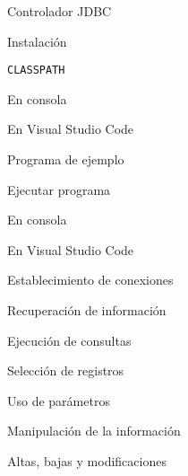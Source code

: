 \begin{longenum}
    \begin{longenum}
        \item Controlador JDBC
        \begin{longenum}
            \item Instalación
            \item \texttt{CLASSPATH}
            \begin{longenum}
                \item En consola
                \item En Visual Studio Code
            \end{longenum}
        \end{longenum}
        \item Programa de ejemplo
        \item Ejecutar programa
        \begin{longenum}
            \item En consola
            \item En Visual Studio Code
        \end{longenum}
        \item Establecimiento de conexiones
        \item Recuperación de información
        \begin{longenum}
            \item Ejecución de consultas
            \item Selección de registros
            \item Uso de parámetros
        \end{longenum}
        \item Manipulación de la información
        \begin{longenum}
            \item Altas, bajas y modificaciones
        \end{longenum}
    \end{longenum}
\end{longenum}
